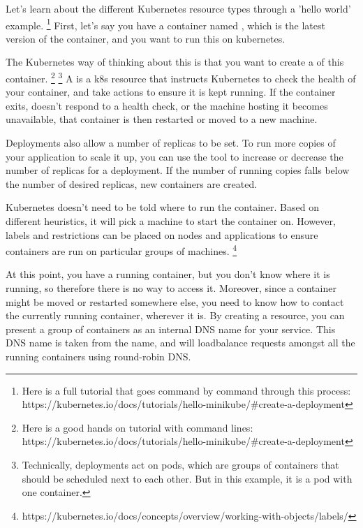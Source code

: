 \documentclass[11pt,twoside]{article}
\begin{document}
Let's learn about the different Kubernetes resource types through a 'hello world' example.
\footnote{Here is a full tutorial that goes command by command through this process: https://kubernetes.io/docs/tutorials/hello-minikube/\#create-a-deployment}
First, let's say you have a container named , which is
the latest version of the  container, and you want to run this on kubernetes.

The Kubernetes way of thinking about this is that you want to create a  of this
container.
\footnote{Here is a good hands on tutorial with command lines: https://kubernetes.io/docs/tutorials/hello-minikube/\#create-a-deployment}
\footnote{Technically, deployments act on pods, which are groups of containers that should be scheduled next to each other.  But in this example, it is a pod with one container.}
A  is a k8s resource that instructs Kubernetes to check the health of your container,
and take actions to ensure it is kept running.  If the container exits, doesn't respond
to a health check, or the machine hosting it becomes unavailable, that container is then restarted
or moved to a new machine.

Deployments also allow a number of replicas to be set.  To run more copies of your application to
scale it up, you can use the  tool to increase or decrease the number of replicas for
a deployment.  If the number of running copies falls below the number of desired replicas, new
containers are created.

Kubernetes doesn't need to be told where to run the container.  Based on different heuristics,
it will pick a machine to start the container on.  However, labels and restrictions can be placed
on nodes and applications to ensure containers are run on particular groups of machines.
\footnote{https://kubernetes.io/docs/concepts/overview/working-with-objects/labels/}

At this point, you have a running container, but you don't know where it is running, so therefore
there is no way to access it.  Moreover, since a container might be moved or restarted somewhere
else, you need to know how to contact the currently running container, wherever it is.  By creating
a  resource, you can present a group of containers as an internal DNS name for your
service.  This DNS name is taken from the  name, and will loadbalance
requests amongst all the running containers using round-robin DNS.
\end{document}
